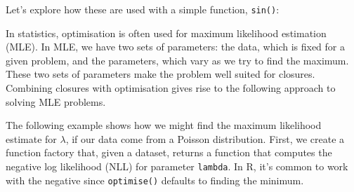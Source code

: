 Let's explore how these are used with a simple function, \texttt{sin()}:

\begin{Shaded}
\begin{Highlighting}[]
\NormalTok{(}\StringTok{ }\NormalTok{(} \NormalTok{/}\StringTok{ }\NormalTok{, } \NormalTok{/}\StringTok{ }\NormalTok{)))}
\NormalTok{(}\NormalTok{(}\NormalTok{, } \NormalTok{*}\StringTok{ }
\NormalTok{(}\NormalTok{(} \NormalTok{))}
\end{Highlighting}
\end{Shaded}

In statistics, optimisation is often used for maximum likelihood
estimation (MLE). In MLE, we have two sets of parameters: the data,
which is fixed for a given problem, and the parameters, which vary as we
try to find the maximum. These two sets of parameters make the problem
well suited for closures. Combining closures with optimisation gives
rise to the following approach to solving MLE problems.

The following example shows how we might find the maximum likelihood
estimate for \(\lambda\), if our data come from a Poisson distribution.
First, we create a function factory that, given a dataset, returns a
function that computes the negative log likelihood (NLL) for parameter
\texttt{lambda}. In R, it's common to work with the negative since
\texttt{optimise()} defaults to finding the minimum.

\begin{Shaded}
\begin{Highlighting}[]
\StringTok{ }
  \StringTok{ }
  \StringTok{ }
    \StringTok{ }\StringTok{ }\StringTok{ }
  \NormalTok{\}}
\NormalTok{\}}
\end{Highlighting}
\end{Shaded}

